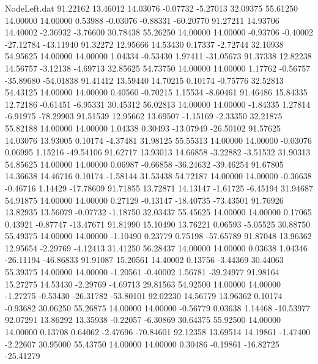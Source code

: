 \begin{filecontents}{NodeLeft.dat}
  91.22162   13.46012   14.03076    -0.07732   -5.27013   32.09375   55.61250   14.00000   14.00000    0.53988   -0.03076   -0.88331  -60.20770
  91.27211   14.93706   14.40002    -2.36932   -3.76600   30.78438   55.26250   14.00000   14.00000   -0.93706   -0.40002  -27.12784  -43.11940
  91.32272   12.95666   14.53430     0.17337   -2.72744   32.10938   54.95625   14.00000   14.00000    1.04334   -0.53430    1.97411  -31.05673
  91.37338   12.82238   14.56757    -3.12138   -4.69713   32.85625   54.73750   14.00000   14.00000    1.17762   -0.56757  -35.89680  -54.01838
  91.41412   13.59440   14.70215     0.10174   -0.75776   32.52813   54.43125   14.00000   14.00000    0.40560   -0.70215    1.15534   -8.60461
  91.46486   15.84335   12.72186    -0.61451   -6.95331   30.45312   56.02813   14.00000   14.00000   -1.84335    1.27814   -6.91975  -78.29903
  91.51539   12.95662   13.69507    -1.15169   -2.33350   32.21875   55.82188   14.00000   14.00000    1.04338    0.30493  -13.07949  -26.50102
  91.57625   14.03076   13.93005     0.10174   -4.37481   31.98125   55.55313   14.00000   14.00000   -0.03076    0.06995    1.15216  -49.54106
  91.62717   13.93013   14.66858    -3.22882   -3.51532   31.90313   54.85625   14.00000   14.00000    0.06987   -0.66858  -36.24632  -39.46254
  91.67805   14.36638   14.46716     0.10174   -1.58144   31.53438   54.72187   14.00000   14.00000   -0.36638   -0.46716    1.14429  -17.78609
  91.71855   13.72871   14.13147    -1.61725   -6.45194   31.94687   54.91875   14.00000   14.00000    0.27129   -0.13147  -18.40735  -73.43501
  91.76926   13.82935   13.56079    -0.07732   -1.18750   32.03437   55.45625   14.00000   14.00000    0.17065    0.43921   -0.87747  -13.47671
  91.81990   15.10490   13.76221     0.06593   -5.05525   30.88750   55.49375   14.00000   14.00000   -1.10490    0.23779    0.75198  -57.65789
  91.87048   13.96362   12.95654    -2.29769   -4.12413   31.41250   56.28437   14.00000   14.00000    0.03638    1.04346  -26.11194  -46.86833
  91.91087   15.20561   14.40002     0.13756   -3.44369   30.44063   55.39375   14.00000   14.00000   -1.20561   -0.40002    1.56781  -39.24977
  91.98164   15.27275   14.53430    -2.29769   -4.69713   29.81563   54.92500   14.00000   14.00000   -1.27275   -0.53430  -26.31782  -53.80101
  92.02230   14.56779   13.96362     0.10174   -0.93682   30.06250   55.26875   14.00000   14.00000   -0.56779    0.03638    1.14468  -10.53977
  92.07291   13.86292   13.35938    -0.22057   -6.30869   30.64375   55.92500   14.00000   14.00000    0.13708    0.64062   -2.47696  -70.84601
  92.12358   13.69514   14.19861    -1.47400   -2.22607   30.95000   55.43750   14.00000   14.00000    0.30486   -0.19861  -16.82725  -25.41279

\end{filecontents}
